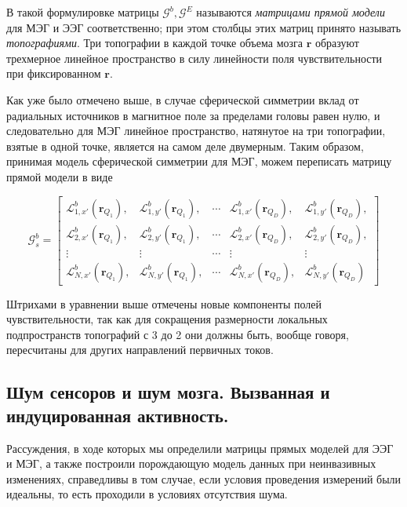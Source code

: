В такой формулировке матрицы $\mathcal{G}^b, \mathcal{G}^E$ называются \emph{матрицами прямой модели} для МЭГ и ЭЭГ соответственно;
при этом столбцы этих матриц принято называть \emph{топографиями}. Три топографии в каждой точке объема мозга $\mathbf{r}$
образуют трехмерное линейное пространство в силу линейности поля чувствительности при фиксированном $\mathbf{r}$.

Как уже было отмечено выше, в случае сферической симметрии вклад от радиальных источников в магнитное поле за пределами головы
равен нулю, и следовательно для МЭГ линейное пространство, натянутое на три топографии, взятые в одной точке, является
на самом деле двумерным. Таким образом, принимая модель сферической симметрии для МЭГ, можем переписать матрицу прямой модели в виде

\begin{equation}
    \mathcal{G}^b_{s} =
    \begin{bmatrix}
        \mathcal{L}_{1,x'}^b(\mathbf{r}_{Q_1}), & \mathcal{L}_{1,y'}^b(\mathbf{r}_{Q_1}), &
        \cdots &
        \mathcal{L}_{1,x'}^b(\mathbf{r}_{Q_D}), & \mathcal{L}_{1,y'}^b(\mathbf{r}_{Q_D}), \\
        \mathcal{L}_{2,x'}^b(\mathbf{r}_{Q_1}), & \mathcal{L}_{2,y'}^b(\mathbf{r}_{Q_1}), &
        \cdots &
        \mathcal{L}_{2,x'}^b(\mathbf{r}_{Q_D}), & \mathcal{L}_{2,y'}^b(\mathbf{r}_{Q_D}), \\
        \vdots                                    & \vdots                                    &
        \cdots &
        \vdots                                    & \vdots                                    \\
        \mathcal{L}_{N,x'}^b(\mathbf{r}_{Q_1}), & \mathcal{L}_{N,y'}^b(\mathbf{r}_{Q_1}), &
        \cdots &
        \mathcal{L}_{N,x'}^b(\mathbf{r}_{Q_D}), & \mathcal{L}_{N,y'}^b(\mathbf{r}_{Q_D})
    \end{bmatrix}
\end{equation}

Штрихами в уравнении выше отмечены новые компоненты полей чувствительности, так как для сокращения размерности
локальных подпространств топографий с 3 до 2 они должны быть, вообще говоря,
пересчитаны для других направлений первичных токов.

\subsection{Шум сенсоров и шум мозга. Вызванная и индуцированная активность.}
Рассуждения, в ходе которых мы определили матрицы прямых моделей для ЭЭГ и МЭГ, а также
построили порождающую модель данных при неинвазивных изменениях, справедливы в том случае, если
условия проведения измерений были идеальны, то есть проходили в условиях отсутствия шума.

